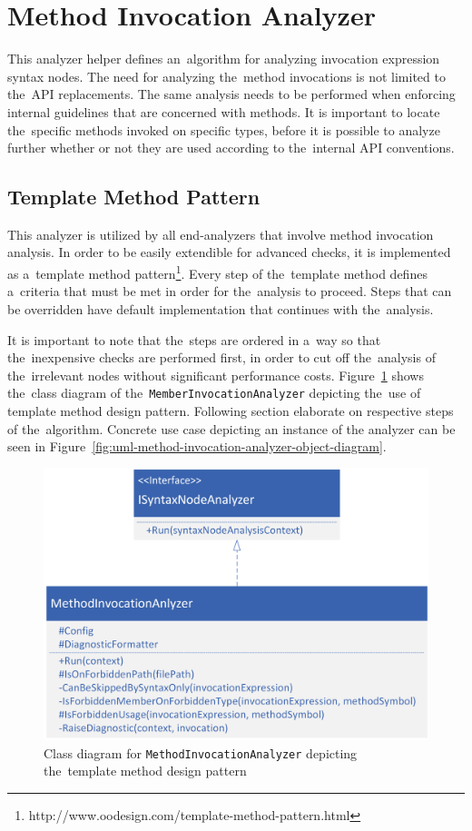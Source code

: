 \documentclass[
  digital, %
  table,   %
  lof,     %
  lot,     %
  oneside,
]{fithesis3}
\begin{document}
\section{Method Invocation Analyzer}
This analyzer helper defines an~algorithm for analyzing invocation expression syntax nodes. The need for analyzing the~method invocations is not limited to the~API replacements. The same analysis needs to be performed when enforcing internal guidelines that are concerned with methods. It is important to locate the~specific methods invoked on specific types, before it is possible to analyze further whether or not they are used according to the~internal API conventions. 

\subsection{Template Method Pattern}
This analyzer is utilized by all end-analyzers that involve method invocation analysis. In order to be easily extendible for advanced checks, it is implemented as a~template method pattern\footnote{http://www.oodesign.com/template-method-pattern.html}. Every step of the~template method defines a~criteria that must be met in order for the~analysis to proceed. Steps that can be overridden have default implementation that continues with the~analysis. 

It is important to note that the~steps are ordered in a~way so that the~inexpensive checks are performed first, in order to cut off the~analysis of the~irrelevant nodes without significant performance costs. Figure~\ref{fig:uml-method-invocation-analyzer} shows the~class diagram of the~\texttt{MemberInvocationAnalyzer} depicting the~use of template method design pattern. Following section elaborate on respective steps of the~algorithm. Concrete use case depicting an instance of the analyzer can be seen in Figure~\ref{fig:uml-method-invocation-analyzer-object-diagram}.  

\begin{figure}[h!]
		\centering
			\includegraphics[scale=0.85]{img/uml/method-invocation-analyzer}
		\caption{Class diagram for \texttt{MethodInvocationAnalyzer} depicting the~template method design pattern}
		\label{fig:uml-method-invocation-analyzer}
\end{figure}
\end{document}
